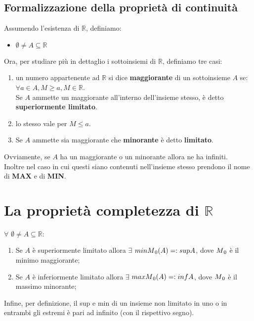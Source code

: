 \documentclass[12pt]{article}
\begin{document}
\subsection{Formalizzazione della proprietà di continuità}
Assumendo l'esistenza di $\mathbb{R}$, definiamo:
\begin{itemize}
    \item $\emptyset \not= A \subseteq \mathbb{R}$
\end{itemize}
Ora, per studiare più in dettaglio i sottoinsiemi di $\mathbb{R}$, definiamo tre casi:
\begin{enumerate}
    \item un numero appartenente ad $\mathbb{R}$ si dice \textbf{maggiorante} di un sottoinsieme $A$ se:\\
        $\forall a \in A, M \geqslant a, M \in \mathbb{R}$.\\
        Se $A$ ammette un maggiorante all'interno dell'insieme stesso, è detto \textbf{superiormente limitato}.
    \item lo stesso vale per $M\leqslant a$.
    \item Se $A$ ammette sia maggiorante che \textbf{minorante} è detto \textbf{limitato}.
\end{enumerate}
Ovviamente, se $A$ ha un maggiorante o un minorante allora ne ha infiniti.\\
Inoltre nel caso in cui questi siano contenuti nell'insieme stesso prendono il nome di \textbf{MAX} e di \textbf{MIN}.
\section{La proprietà completezza di $\mathbb{R}$}
$\forall$ $\emptyset \not= A \subseteq \mathbb{R}$:
\begin{enumerate}
    \item Se $A$ è superiormente limitato allora $\exists$ $minM\textsubscript{0} (A) =: sup A$, dove $M\textsubscript{0}$ è il minimo maggiorante;
    \item Se $A$ è inferiormente limitato allora $\exists$ $maxM\textsubscript{0} (A) =: inf A$, dove $M\textsubscript{0}$ è il massimo minorante;
\end{enumerate}
Infine, per definizione, il sup e min di un insieme non limitato in uno o in entrambi gli estremi è pari ad infinito (con il rispettivo segno).
\end{document}
